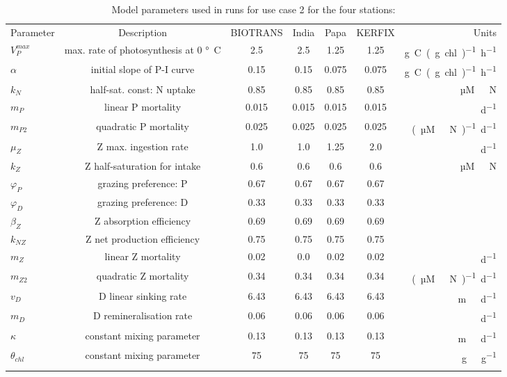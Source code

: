 \documentclass[journal abbreviation, manuscript]{copernicus}
\begin{document}
%
\begin{table}[t]
\caption{Model parameters used in runs for use case 2 for the four stations:}
\begin{tabular}{l c c c c c r}
\tophline
Parameter & Description & BIOTRANS & India & Papa & KERFIX & Units \\
\middlehline

$V_P^{max}$ & max. rate of photosynthesis at 0 \unit{\degree C} & 2.5 & 2.5 & 1.25 & 1.25 & \unit{g C (g chl)^{-1} h^{-1}}\\
$\alpha$ & initial slope of P-I curve & 0.15 & 0.15 & 0.075 & 0.075 & \unit{g C (g chl)^{-1} h^{-1}}\\
$k_N$ & half-sat. const: N uptake & 0.85  & 0.85  & 0.85  & 0.85 & \unit{µM \ N} \\
$m_P$ & linear P mortality & 0.015 & 0.015 & 0.015 & 0.015  & \unit{d^{−1}} \\
$m_{P2}$ & quadratic P mortality & 0.025 & 0.025 & 0.025 & 0.025 & \unit{(µM \ N)^{-1} d^{−1}} \\
$\mu_Z$ & Z max. ingestion rate & 1.0 & 1.0 & 1.25 & 2.0 & \unit{d^{−1}} \\
$k_Z$ & Z half-saturation for intake & 0.6 & 0.6 & 0.6 & 0.6 & \unit{µM \ N} \\
$\varphi_P$ & grazing preference: P & 0.67 & 0.67 & 0.67 & 0.67 & \\
$\varphi_D$ & grazing preference: D & 0.33 & 0.33 & 0.33 & 0.33 & \\
$\beta_Z$ & Z absorption efficiency & 0.69 & 0.69 & 0.69 & 0.69 &\\
$k_{NZ}$ & Z net production efficiency & 0.75 & 0.75 & 0.75 &  0.75 &\\
$m_Z$ & linear Z mortality  & 0.02 & 0.0 & 0.02 & 0.02 & \unit{d^{−1}} \\
$m_{Z2}$ & quadratic Z mortality & 0.34 & 0.34 & 0.34 & 0.34 & \unit{(µM \ N)^{-1} d^{−1}}  \\
$v_D$ & D linear sinking rate & 6.43 & 6.43 & 6.43 & 6.43 & \unit{m \ d^{−1}}\\
$m_D$ & D remineralisation rate & 0.06 & 0.06 & 0.06 & 0.06 & \unit{d^{−1}} \\
$\kappa$ & constant mixing parameter & 0.13 & 0.13 & 0.13 & 0.13 & \unit{m \ d^{−1}}\\
$\theta_{chl}$& constant mixing parameter & 75 & 75 & 75 & 75 & \unit{g \ g^{−1}} \\

\bottomhline
\end{tabular}
\label{Appendix:Table:EMPOWERparams}
\end{table}
%
\end{document}
